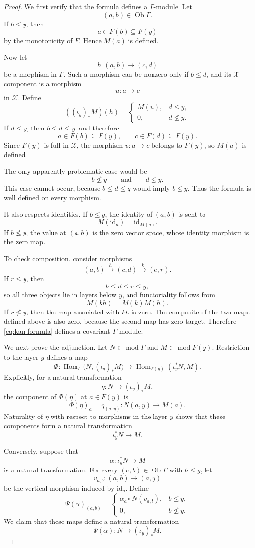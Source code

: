 \documentclass[12pt,a4paper,english,reqno]{amsart}
\theoremstyle{plain}
\theoremstyle{definition}
\newcommand{\Hom}{\operatorname{Hom}}
\newcommand{\id}{\mathrm{id}}
\newcommand{\X}{\mathcal X}
\newcommand{\G}{\Gamma}
\newcommand{\modu}{\operatorname{mod}}
\begin{document}
\begin{proof}
We first verify that the formula defines a $\G$-module. Let
\[
(a,b)\in\operatorname{Ob}\G.
\]
If $b\leq y$, then
\[
a\in F(b)\subseteq F(y)
\]
by the monotonicity of $F$. Hence $M(a)$ is defined.

Now let
\[
h:(a,b)\longrightarrow(c,d)
\]
be a morphism in $\G$. Such a morphism can be nonzero only if
$b\leq d$, and its $\X$-component is a morphism
\[
u:a\longrightarrow c
\]
in $\X$. Define
\[
((\iota_y)_*M)(h)
=
\begin{cases}
M(u), & d\leq y,\\
0,    & d\nleq y.
\end{cases}
\]
If $d\leq y$, then $b\leq d\leq y$, and therefore
\[
a\in F(b)\subseteq F(y),
\qquad
c\in F(d)\subseteq F(y).
\]
Since $F(y)$ is full in $\X$, the morphism $u:a\to c$ belongs to
$F(y)$, so $M(u)$ is defined.

The only apparently problematic case would be
\[
b\nleq y
\qquad\text{and}\qquad
d\leq y.
\]
This case cannot occur, because $b\leq d\leq y$ would imply
$b\leq y$. Thus the formula is well defined on every morphism.

It also respects identities. If $b\leq y$, the identity of $(a,b)$ is
sent to
\[
M(\id_a)=\id_{M(a)}.
\]
If $b\nleq y$, the value at $(a,b)$ is the zero vector space, whose
identity morphism is the zero map.

To check composition, consider morphisms
\[
(a,b)\xrightarrow{h}(c,d)\xrightarrow{k}(e,r).
\]
If $r\leq y$, then
\[
b\leq d\leq r\leq y,
\]
so all three objects lie in layers below $y$, and functoriality follows
from
\[
M(kh)=M(k)M(h).
\]
If $r\nleq y$, then the map associated with $kh$ is zero. The composite
of the two maps defined above is also zero, because the second map has
zero target. Therefore \eqref{eq:kan-formula} defines a covariant
$\G$-module.

We next prove the adjunction. Let $N\in\modu\G$ and
$M\in\modu F(y)$. Restriction to the layer $y$ defines a map
\[
\Phi:
\Hom_{\G}\bigl(N,(\iota_y)_*M\bigr)
\longrightarrow
\Hom_{F(y)}(\iota_y^*N,M).
\]
Explicitly, for a natural transformation
\[
\eta:N\longrightarrow(\iota_y)_*M,
\]
the component of $\Phi(\eta)$ at $a\in F(y)$ is
\[
\Phi(\eta)_a=\eta_{(a,y)}:
N(a,y)\longrightarrow M(a).
\]
Naturality of $\eta$ with respect to morphisms in the layer $y$ shows
that these components form a natural transformation
\[
\iota_y^*N\longrightarrow M.
\]

Conversely, suppose that
\[
\alpha:\iota_y^*N\longrightarrow M
\]
is a natural transformation. For every $(a,b)\in\operatorname{Ob}\G$
with $b\leq y$, let
\[
v_{a,b}:(a,b)\longrightarrow(a,y)
\]
be the vertical morphism induced by $\id_a$. Define
\[
\Psi(\alpha)_{(a,b)}
=
\begin{cases}
\alpha_a\circ N(v_{a,b}), & b\leq y,\\
0,                         & b\nleq y.
\end{cases}
\]
We claim that these maps define a natural transformation
\[
\Psi(\alpha):N\longrightarrow(\iota_y)_*M.
\]


\end{proof}
\end{document}
